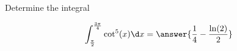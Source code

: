 \documentclass{ximera}
\author{Jason Miller}
\begin{document}
\begin{exercise}
Determine the integral

\[
\int_{\frac{\pi}{2}}^{\frac{3\pi}{4}} \cot^{5}(x) \d x=\answer{ \frac{1}{4}-\frac{ \ln(2)}{2}}
\]


\end{exercise}
\end{document}
